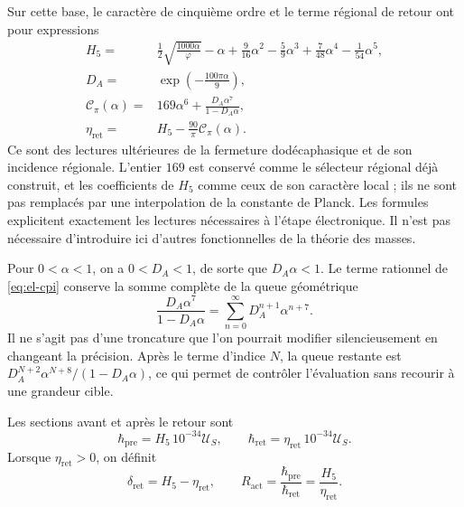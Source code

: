 Sur cette base, le caractère de cinquième ordre et le terme régional de
retour ont pour expressions
\begin{align}
 H_5={}&\frac12\sqrt{\frac{1000\alpha}{\varphi}}-\alpha
   +\frac9{16}\alpha^2-\frac59\alpha^3
   +\frac7{48}\alpha^4-\frac1{54}\alpha^5,
   \label{eq:el-h5}\\
 D_A={}&\exp\!\left(-\frac{100\pi\alpha}{9}\right),
   \label{eq:el-da}\\
 \mathcal C_\pi(\alpha)={}&169\alpha^6+
       \frac{D_A\alpha^7}{1-D_A\alpha},
   \label{eq:el-cpi}\\
 \eta_{\mathrm{ret}}={}&H_5-\frac{90}{\pi}\mathcal C_\pi(\alpha).
   \label{eq:el-eta}
\end{align}
Ce sont des lectures ultérieures de la fermeture dodécaphasique et de son
incidence régionale. L'entier \(169\) est conservé comme le sélecteur
régional déjà construit, et les coefficients de \(H_5\) comme ceux de son
caractère local ; ils ne sont pas remplacés par une interpolation de la constante de
Planck. Les formules explicitent exactement les lectures nécessaires
à l'étape électronique. Il n'est pas nécessaire d'introduire ici d'autres
fonctionnelles de la théorie des masses.

Pour \(0<\alpha<1\), on a \(0<D_A<1\), de sorte que
\(D_A\alpha<1\). Le terme rationnel de \eqref{eq:el-cpi} conserve la
somme complète de la queue géométrique
\begin{equation}
 \frac{D_A\alpha^7}{1-D_A\alpha}
 =\sum_{n=0}^{\infty}D_A^{n+1}\alpha^{n+7}.
 \label{eq:el-cola-regional}
\end{equation}
Il ne s'agit pas d'une troncature que l'on pourrait modifier silencieusement en changeant la
précision. Après le terme d'indice \(N\), la queue restante est
\(D_A^{N+2}\alpha^{N+8}/(1-D_A\alpha)\), ce qui permet de contrôler
l'évaluation sans recourir à une grandeur cible.

\begin{definition}
Les sections avant et après le retour sont
\begin{equation}
 \hbar_{\mathrm{pre}}=H_5\,10^{-34}\mathcal U_S,
 \qquad
 \hbar_{\mathrm{ret}}=\eta_{\mathrm{ret}}\,10^{-34}\mathcal U_S.
 \label{eq:el-secciones-accion}
\end{equation}
Lorsque \(\eta_{\mathrm{ret}}>0\), on définit
\begin{equation}
 \delta_{\mathrm{ret}}=H_5-\eta_{\mathrm{ret}},\qquad
 R_{\mathrm{act}}=\frac{\hbar_{\mathrm{pre}}}{\hbar_{\mathrm{ret}}}
 =\frac{H_5}{\eta_{\mathrm{ret}}}.
 \label{eq:el-ratio}
\end{equation}
\end{definition}

